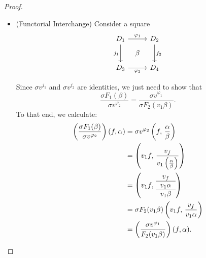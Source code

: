 \documentclass[DynamicalBook]{subfiles}
\begin{document}
\begin{proof}
\begin{itemize}
\item (Functorial Interchange) Consider a square
\[
\begin{tikzcd}[sep=tiny]
D_1 \ar[rr, "\varphi_1"] \ar[dd, "j_1"'] & & D_2 \ar[dd, "f_2"] \\
 & \beta & \\
D_3 \ar[rr, "\varphi_2"'] & & D_4
\end{tikzcd}
\]

Since $\sigma v^{j_1}$ and $\sigma v^{j_2}$ are identities, we just need to show
that 
$$\frac{\sigma F_1 (\beta)}{\sigma v^{\varphi_2}} = \frac{\sigma
  v^{\varphi_1}}{\sigma F_2 (v_1 \beta)}.$$
To that end, we calculate:
\begin{align*}
\left( \frac{\sigma F_1 (\beta)}{\sigma v^{\varphi_2}} \right)(f, \alpha) &= \sigma v^{\varphi_2}\left( f,\, \frac{\alpha}{\beta} \right) \\
&= \left( v_1 f,\, \frac{v_f}{v_1\left( \frac{\alpha}{\beta} \right)} \right) \\
&= \left( v_1 f,\, {\begin{tabular}{c} $v_f$ \\ \hline $v_1 \alpha$ \\ \hline $v_1 \beta$ \end{tabular}} \right) \\
&= \sigma F_2(v_1 \beta)\left( v_1 f,\,  \frac{v_f}{v_1 \alpha} \right) \\
&= \left( \frac{\sigma v^{\varphi_1}}{F_2(v_1 \beta)} \right)(f, \alpha).
\end{align*}
\end{itemize}

\end{proof}
\end{document}
